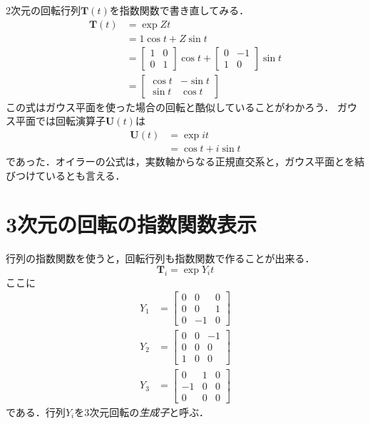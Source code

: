 \documentclass{jsbook}
\newcommand{\keyword}[1]{\emph{#1}}
\newcommand{\bop}[1]{\boldsymbol{#1}}
\newcommand{\im}{i}%
\begin{document}
2次元の回転行列$\bop{T}(t)$を指数関数で書き直してみる．
\begin{align}
\bop{T}(t)&=\exp Zt\\
  &=1\cos t+Z\sin t\\
  &=\begin{bmatrix}1&0\\0&1\end{bmatrix}\cos t+\begin{bmatrix}0&-1\\1&0\end{bmatrix}\sin t\\
  &=\begin{bmatrix}\cos t&-\sin t\\\sin t&\cos t\end{bmatrix}
\end{align}
この式はガウス平面を使った場合の回転と酷似していることがわかろう．
ガウス平面では回転演算子$\bop{U}(t)$は
\begin{align}
\bop{U}(t)&=\exp \im t\\
  &=\cos t+\im\sin t
\end{align}
であった．オイラーの公式は，実数軸からなる正規直交系と，ガウス平面とを結びつけているとも言える．



\section{3次元の回転の指数関数表示}

行列の指数関数を使うと，回転行列も指数関数で作ることが出来る．
\begin{equation}
\bop{T}_i=\exp Y_it
\end{equation}
ここに
\begin{align}
Y_1&=\begin{bmatrix}0&0&0\\0&0&1\\0&-1&0\end{bmatrix}\\
Y_2&=\begin{bmatrix}0&0&-1\\0&0&0\\1&0&0\end{bmatrix}\\
Y_3&=\begin{bmatrix}0&1&0\\-1&0&0\\0&0&0\end{bmatrix}
\end{align}
である．行列$Y_i$を3次元回転の\keyword{生成子}と呼ぶ．
\end{document}

